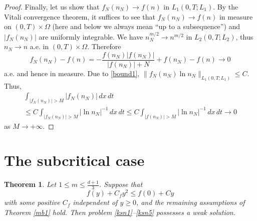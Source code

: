 \documentclass[10pt]{amsart}
\newtheorem {theorem} {Theorem} [section]
\begin{document}
\begin{proof}
Finally, let us show that $f_N(n_N)\to f(n)$ in $L_1(0,T; L_{1})$. By the Vitali convergence theorem, it suffices to see that $f_N(n_N)\to f(n)$ in measure on $(0,T)\times \Omega$ (here and below we always mean ``up to a subsequence'') and $|f_N(n_N)|$ are uniformly integrable. We have $n_N^{m/2}\to n^{m/2}$ in $L_2(0,T; L_{2})$, thus $n_N\to n$ a.e. in $(0,T)\times \Omega$. Therefore $$f_N(n_N)- f(n)=-\frac{f(n_N)|f(n_N)|}{|f(n_N)|+N}+f(n_N)-f(n)\to 0$$ a.e. and hence in measure. Due to \eqref{bound1}, $\|f_N(n_N)\ln n_N\|_{L_{1}(0, T; L_{1})}\leq C$. Thus,  \begin{multline}\int_{|f_N(n_N)|>M}|f_N(n_N)|\,dx\,dt  \\ \leq C \int_{|f_N(n_N)|>M}|\ln n_N|^{-1}\,dx\,dt \leq C \int_{|f(n_N)|>M}|\ln n_N|^{-1}\,dx\,dt \to 0\end{multline} as $M\to+\infty$. 

\end{proof}

\section{The subcritical case}

\begin{theorem} \label{mr1} Let $1 \leq m\leq\frac {d+1} 3$. Suppose that \begin{equation} \label{asf2} f(y)+C_f y^2\leq f(0)+Cy \end{equation} with some positive $C_f$ independent of $y\geq 0$, and the remaining assumptions of Theorem \ref{mb1} hold. Then problem \eqref{ksn1}--\eqref{ksn5} possesses a weak solution. 
\end{theorem}
\end{document}
